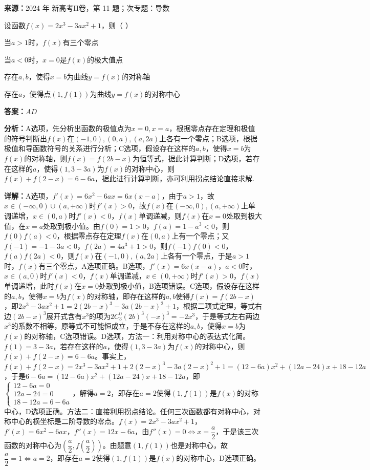\begin{question}[points=6]
\textbf{来源：}2024 年 新高考II卷，第 11 题；次专题：导数\par
设函数$f(x)=2x^3-3ax^2+1$，则（ ）
\begin{choices}
  \item 当$a>1$时，$f(x)$有三个零点
  \item 当$a<0$时，$x=0$是$f(x)$的极大值点
  \item 存在$a,b$，使得$x=b$为曲线$y=f(x)$的对称轴
  \item 存在$a$，使得点$(1,f(1))$为曲线$y=f(x)$的对称中心
\end{choices}
\begin{solution}
\textbf{答案：}$AD$

\textbf{分析：}A选项，先分析出函数的极值点为$x=0,x=a$，根据零点存在定理和极值的符号判断出$f(x)$在$(-1,0),(0,a),(a,2a)$上各有一个零点；B选项，根据极值和导函数符号的关系进行分析；C选项，假设存在这样的$a,b$，使得$x=b$为$f(x)$的对称轴，则$f(x)=f(2b-x)$为恒等式，据此计算判断；D选项，若存在这样的$a$，使得$(1,3-3a)$为$f(x)$的对称中心，则$f(x)+f(2-x)=6-6a$，据此进行计算判断，亦可利用拐点结论直接求解.

\textbf{详解：}A选项，$f'(x)=6x^2-6ax=6x(x-a)$，由于$a>1$，故$x\in(-\infty,0)\cup(a,+\infty)$时$f'(x)>0$，故$f(x)$在$(-\infty,0),(a,+\infty)$上单调递增，$x\in(0,a)$时$f'(x)<0$，$f(x)$单调递减，则$f(x)$在$x=0$处取到极大值，在$x=a$处取到极小值。由$f(0)=1>0$，$f(a)=1-a^3<0$，则$f(0)f(a)<0$，根据零点存在定理$f(x)$在$(0,a)$上有一个零点；又$f(-1)=-1-3a<0$，$f(2a)=4a^3+1>0$，则$f(-1)f(0)<0$，$f(a)f(2a)<0$，则$f(x)$在$(-1,0),(a,2a)$上各有一个零点，于是$a>1$时，$f(x)$有三个零点，A选项正确。B选项，$f'(x)=6x(x-a)$，$a<0$时，$x\in(a,0)$时$f'(x)<0$，$f(x)$单调递减，$x\in(0,+\infty)$时$f'(x)>0$，$f(x)$单调递增，此时$f(x)$在$x=0$处取到极小值，B选项错误。C选项，假设存在这样的$a,b$，使得$x=b$为$f(x)$的对称轴，即存在这样的$a,b$使得$f(x)=f(2b-x)$，即$2x^3-3ax^2+1=2(2b-x)^3-3a(2b-x)^2+1$，根据二项式定理，等式右边$(2b-x)^3$展开式含有$x^3$的项为$2C_3^0(2b)^3(-x)^3=-2x^3$，于是等式左右两边$x^3$的系数不相等，原等式不可能恒成立，于是不存在这样的$a,b$，使得$x=b$为$f(x)$的对称轴，C选项错误。D选项，方法一：利用对称中心的表达式化简。$f(1)=3-3a$，若存在这样的$a$，使得$(1,3-3a)$为$f(x)$的对称中心，则$f(x)+f(2-x)=6-6a$。事实上，$f(x)+f(2-x)=2x^3-3ax^2+1+2(2-x)^3-3a(2-x)^2+1=(12-6a)x^2+(12a-24)x+18-12a$，于是$6-6a=(12-6a)x^2+(12a-24)x+18-12a$，即$\begin{cases}12-6a=0\\12a-24=0\\18-12a=6-6a\end{cases}$，解得$a=2$，即存在$a=2$使得$(1,f(1))$是$f(x)$的对称中心，D选项正确。方法二：直接利用拐点结论。任何三次函数都有对称中心，对称中心的横坐标是二阶导数的零点。$f(x)=2x^3-3ax^2+1$，$f'(x)=6x^2-6ax$，$f''(x)=12x-6a$，由$f''(x)=0\Leftrightarrow x=\dfrac{a}{2}$，于是该三次函数的对称中心为$\left(\dfrac{a}{2},f\left(\dfrac{a}{2}\right)\right)$。由题意$(1,f(1))$也是对称中心，故$\dfrac{a}{2}=1\Leftrightarrow a=2$，即存在$a=2$使得$(1,f(1))$是$f(x)$的对称中心，D选项正确。
\end{solution}
\end{question}

